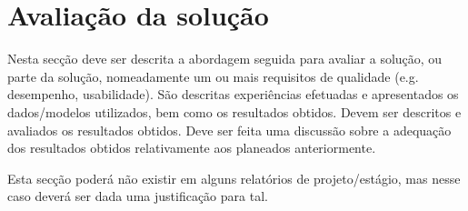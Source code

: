 \section{Avalia\c{c}\~ao da solu\c{c}\~ao} %
\label{sec:avaliacao}

Nesta secção deve ser descrita a abordagem seguida para avaliar a solução, ou parte da solução, nomeadamente um ou mais requisitos de qualidade (e.g. desempenho, usabilidade). São descritas experiências efetuadas e apresentados os dados/modelos utilizados, bem como os resultados obtidos. Devem ser descritos e avaliados os resultados obtidos. Deve ser feita uma discussão sobre a adequação dos resultados obtidos relativamente aos planeados anteriormente.

Esta secção poderá não existir em alguns relatórios de projeto/estágio, mas nesse caso deverá ser dada uma justificação para tal.

